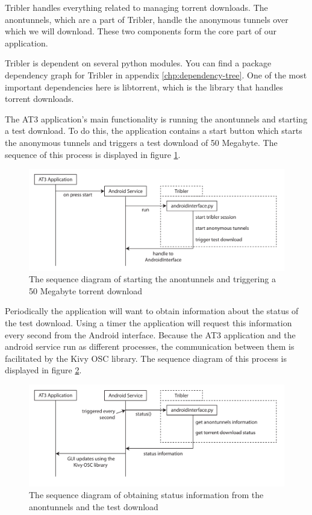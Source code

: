 Tribler handles everything related to managing torrent downloads. The anontunnels, which are a part of Tribler, handle the anonymous tunnels over which we will download. These two components form the core part of our application.

Tribler is dependent on several python modules. You can find a package dependency graph for Tribler in appendix \ref{chp:dependency-tree}. One of the most important dependencies here is libtorrent, which is the library that handles torrent downloads.

The AT3 application's main functionality is running the anontunnels and starting a test download. To do this, the application contains a start button which starts the anonymous tunnels and triggers a test download of 50 Megabyte. The sequence of this process is displayed in figure \ref{fig:sequencestart}.

\begin{figure}[!h]
	\centering
	\includegraphics[width=\textwidth]{graphics/sequence-start.pdf}
	\caption{The sequence diagram of starting the anontunnels and triggering a 50 Megabyte torrent download}
	\label{fig:sequencestart}
\end{figure}

Periodically the application will want to obtain information about the status of the test download. Using a timer the application will request this information every second from the Android interface. Because the AT3 application and the android service run as different processes, the communication between them is facilitated by the Kivy OSC library. The sequence diagram of this process is displayed in figure \ref{fig:sequenceinfo}.

\begin{figure}[!t]
	\centering
	\includegraphics[width=\textwidth]{graphics/sequence-info.pdf}
	\caption{The sequence diagram of obtaining status information from the anontunnels and the test download}
	\label{fig:sequenceinfo}
\end{figure}

